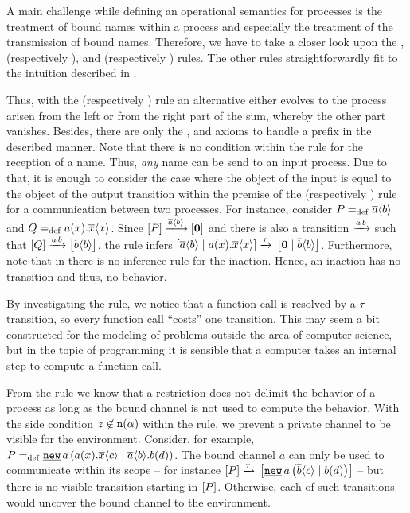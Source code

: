 A main challenge while defining an operational semantics for \picalc{} processes is the treatment of bound names within a process and especially the treatment of the transmission of bound names. Therefore, we have to take a closer look upon the \eres{}, \eparl{} (respectively \eparr{}), \eopen{} and \eclosel{} (respectively \ecloser{}) rules. The other rules straightforwardly fit to the intuition described in .

Thus, with the \esuml{} (respectively \esumr{}) rule an alternative either evolves to the process arisen from the left or from the right part of the sum, whereby the other part vanishes. Besides, there are only the \etau{}, \eout{} and \ein{} axioms to handle a prefix in the described manner. Note that there is no condition within the \ein{} rule for the reception of a name. Thus, \textit{any} name can be send to an input process. Due to that, it is enough to consider the case where the object of the input is equal to the object of the output transition within the premise of the \ecoml{} (respectively \ecomr{}) rule for a communication between two processes. For instance, consider $P=_{\mathrm{def}}\overline{a}\langle b\rangle$ and $Q=_{\mathrm{def}}a(x).\overline{x}\langle x\rangle$. Since $\left[P\right]\xrightarrow{\overline{a}\langle b\rangle}\left[\mathbf{0}\right]$ and there is also a transition $\xrightarrow{a\,b}$ such that $\left[Q\right]\xrightarrow{a\,b}\left[\overline{b}\langle b\rangle\right]$, the \ecoml{} rule infers $\left[\overline{a}\langle b\rangle \mid a(x).\overline{x}\langle x\rangle\right]\xrightarrow{\tau}{}\left[\mathbf{0} \mid \overline{b}\langle b\rangle\right]$. Furthermore, note that in  there is no inference rule for the inaction. Hence, an inaction has no transition and thus, no behavior.

By investigating the \ecall{} rule, we notice that a function call is resolved by a $\tau$ transition, so every function call ``costs'' one transition. This may seem a bit constructed for the modeling of problems outside the area of computer science, but in the topic of programming it is sensible that a computer takes an internal step to compute a function call.

From the \eres{} rule we know that a restriction does not delimit the behavior of a process as long as the bound channel is not used to compute the behavior. With the side condition $z\not\in\mathtt{n}(\alpha)$ within the \eres{} rule, we prevent a private channel to be visible for the environment. Consider, for example, $P\define{}\procres[()]
{a}{\procpar{\inp{a}{x}.\out{x}{c}}{\out{a}{b}.\inp{b}{d}}}$. The bound channel $a$ can only be used to communicate within its scope -- for instance $\ec{P}\tautrans{}\ec{\procres[()]{a}{\procpar{\out{b}{c}}{\inp{b}{d}}}}$ -- but there is no visible transition starting in $\left[P\right]$. Otherwise, each of such transitions would uncover the bound channel to the environment.

